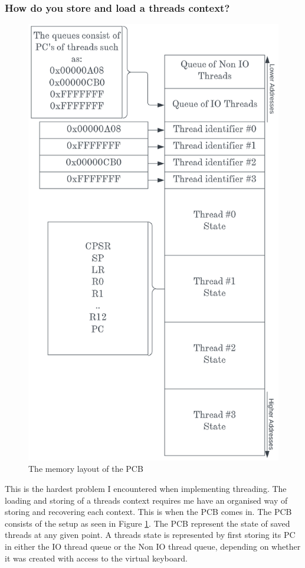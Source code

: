 \subsubsection{How do you store and load a threads context?}


\begin{figure}\centering
	\includegraphics[scale=0.335]{figures/PCB.png}
	\caption{The memory layout of the PCB}
	\label{fig:PCB}
\end{figure} 
This is the hardest problem I encountered when implementing threading. The loading and storing of a threads context requires me have an organised way of storing and recovering each context. This is when the PCB comes in. The PCB consists of the setup as seen in  Figure \ref{fig:PCB}. The PCB represent the state of saved threads at any given point. A threads state is represented by first storing its PC in either the IO thread queue or the Non IO thread queue, depending on whether it was created with access to the virtual keyboard.
